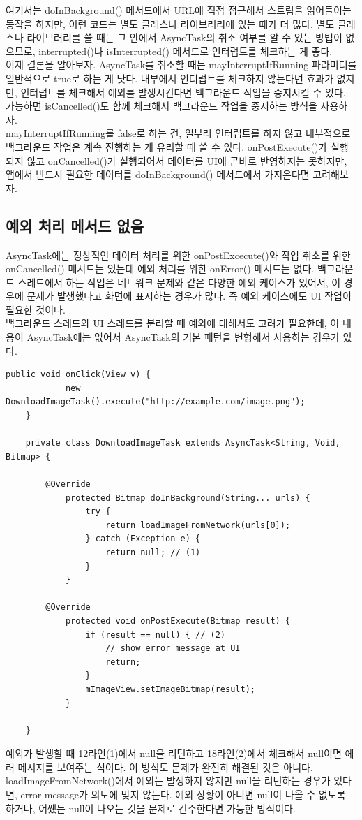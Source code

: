 여기서는 doInBackground() 메서드에서 URL에 직접 접근해서 스트림을 읽어들이는 동작을 하지만, 이런 코드는 별도 클래스나 라이브러리에 있는 때가 더 많다.
별도 클래스나 라이브러리를 쓸 때는 그 안에서  AsyncTask의 취소 여부를 알 수 있는 방법이 없으므로, interrupted()나 isInterrupted() 메서드로 인터럽트를 체크하는 게 좋다.\\

이제 결론을 알아보자. AsyncTask를 취소할 때는 mayInterruptIfRunning 파라미터를 일반적으로 true로 하는 게 낫다. 
내부에서 인터럽트를 체크하지 않는다면 효과가 없지만, 인터럽트를 체크해서 예외를 발생시킨다면 백그라운드 작업을 중지시킬 수 있다.
가능하면 isCancelled()도 함께 체크해서 백그라운드 작업을 중지하는 방식을 사용하자.\\

mayInterruptIfRunning를 false로 하는 건, 일부러 인터럽트를 하지 않고 내부적으로 백그라운드 작업은 계속 진행하는 게 유리할 때 쓸 수 있다.
onPostExecute()가 실행되지 않고 onCancelled()가 실행되어서 데이터를  UI에 곧바로 반영하지는 못하지만, 앱에서 반드시 필요한 데이터를 doInBackground() 메서드에서 가져온다면 고려해보자.

\subsection{예외 처리 메서드 없음} 
AsyncTask에는 정상적인 데이터 처리를 위한 onPostExcecute()와 작업 취소를 위한 onCancelled() 메서드는 있는데 예외 처리를 위한 onError() 메서드는 없다. 
백그라운드 스레드에서 하는 작업은 네트워크 문제와 같은 다양한 예외 케이스가 있어서, 이 경우에 문제가 발생했다고 화면에 표시하는 경우가 많다. 
즉 예외 케이스에도 UI 작업이 필요한 것이다.\\

백그라운드 스레드와 UI 스레드를 분리할 때 예외에 대해서도 고려가 필요한데, 이 내용이 AsyncTask에는 없어서 AsyncTask의 기본 패턴을 변형해서 사용하는 경우가 있다.
\begin{lstlisting}[frame=single]
	public void onClick(View v) {
    		new DownloadImageTask().execute("http://example.com/image.png");
	}

	private class DownloadImageTask extends AsyncTask<String, Void, Bitmap> {
	
		@Override
    		protected Bitmap doInBackground(String... urls) {
    			try {
        			return loadImageFromNetwork(urls[0]);
        		} catch (Exception e) {
        			return null; // (1)
        		}
    		}

      	@Override
    		protected void onPostExecute(Bitmap result) {
    			if (result == null) { // (2)
    				// show error message at UI
    				return;
    			}
        		mImageView.setImageBitmap(result);
    		}
    	
	}	
\end{lstlisting}
예외가 발생할 때 12라인(1)에서 null을 리턴하고 18라인(2)에서 체크해서 null이면 에러 메시지를 보여주는 식이다. 이 방식도 문제가 완전히 해결된 것은 아니다. 
loadImageFromNetwork()에서 예외는 발생하지 않지만 null을 리턴하는 경우가 있다면, error message가 의도에 맞지 않는다. 
예외 상황이 아니면 null이 나올 수 없도록 하거나, 어쨌든 null이 나오는 것을 문제로 간주한다면 가능한 방식이다. 

